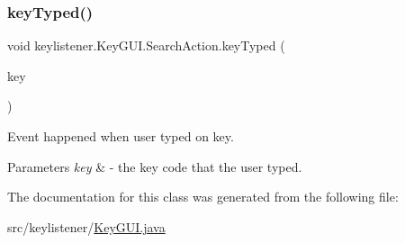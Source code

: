 \subsubsection{\texorpdfstring{key\+Typed()}{keyTyped()}}
{\footnotesize\ttfamily void keylistener.\+Key\+G\+U\+I.\+Search\+Action.\+key\+Typed (\begin{DoxyParamCaption}\item[{Key\+Event}]{key }\end{DoxyParamCaption})\hspace{0.3cm}{\ttfamily [inline]}}

Event happened when user typed on key. 
\begin{DoxyParams}{Parameters}
{\em key} & -\/ the key code that the user typed. \\
\hline
\end{DoxyParams}


The documentation for this class was generated from the following file\+:\begin{DoxyCompactItemize}
\item 
src/keylistener/\hyperlink{_key_g_u_i_8java}{Key\+G\+U\+I.\+java}\end{DoxyCompactItemize}
